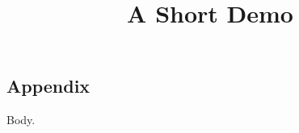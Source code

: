 \documentclass[article]{jss}
\title{A Short Demo}
\begin{document}
\begin{appendix}
\section{ Appendix }
Body.
\end{appendix}
\end{document}
